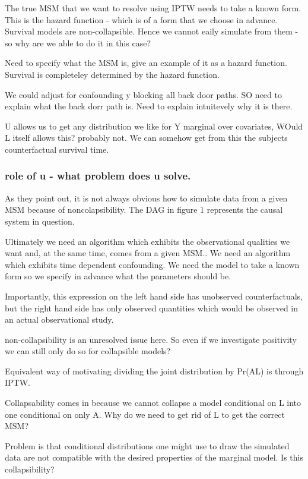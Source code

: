 \documentclass[11pt]{article}
\begin{document}
The true MSM that we want to resolve using IPTW needs to take a known
form. This is the hazard function - which is of a form that we choose in
advance. Survival models are non-collapsible. Hence we cannot eaily
simulate from them - so why are we able to do it in this case?

Need to specify what the MSM is, give an example of it as a hazard
function. Survival is completeley determined by the hazard function.

We could adjust for confounding y blocking all back door paths. SO need
to explain what the back dorr path is. Need to explain intuitevely why
it is there.

U allows us to get any distribution we like for Y marginal over
covariates, WOuld L itself allows this? probably not. We can somehow get
from this the subjects counterfactual survival time.

\subsubsection{role of u - what problem does u
solve.}\label{role-of-u---what-problem-does-u-solve.}

As they point out, it is not always obvious how to simulate data from a
given MSM because of noncolapsibility. The DAG in figure 1 represents
the causal system in question.

Ultimately we need an algorithm which exhibits the observational
qualities we want and, at the same time, comes from a given MSM.. We
need an algorithm which exhibits time dependent confounding. We need the
model to take a known form so we specify in advance what the parameters
should be.

Importantly, this expression on the left hand side has unobserved
counterfactuals, but the right hand side has only observed quantities
which would be observed in an actual observational study.

non-collapsibility is an unresolved issue here. So even if we
investigate positivity we can still only do so for collapsible models?

Equivalent way of motivating dividing the joint distribution by
Pr(A\textbar{}L) is through IPTW.

Collapsability comes in because we cannot collapse a model conditional
on L into one conditional on only A. Why do we need to get rid of L to
get the correct MSM?

Problem is that conditional distributions one might use to draw the
simulated data are not compatible with the desired properties of the
marginal model. Is this collapsibility?
\end{document}
